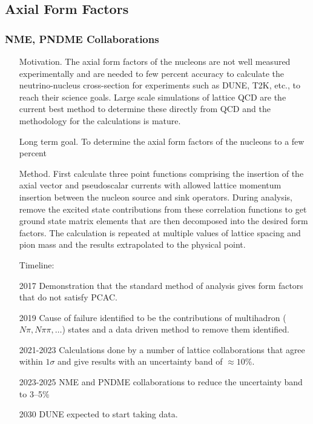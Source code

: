 \documentclass[prd,showpacs,showkeys,preprintnumbers,floatfix,
nofootinbib%
]{revtex4-2}
\begin{document}
\subsection{Axial Form Factors}\label{sec:axff}

\subsubsection{NME, PNDME Collaborations}
\begin{itemize}
    \item[Motivation.] The axial form factors of the nucleons are not well measured experimentally and are
      needed to few percent accuracy to calculate the neutrino-nucleus cross-section for experiments such as DUNE, T2K, etc., to 
      reach their science goals. Large scale simulations of lattice QCD are the current 
      best method to determine these directly from QCD and the methodology for the 
      calculations is mature. 
    \item[Long term goal.] To determine the axial form factors of the nucleons to a few percent 
    \item[Method.] First calculate three point functions comprising the insertion of the axial vector and pseudoscalar currents 
      with allowed lattice  momentum insertion between the nucleon source and sink operators. During analysis, remove 
      the excited state contributions from these correlation functions to get ground state matrix elements that are 
      then decomposed into the desired form factors. The calculation is repeated at multiple values of lattice spacing and 
      pion mass and the results extrapolated to the physical point. 
\item[Timeline:]
    \item[2017] Demonstration that the standard method of analysis gives form factors that do not satisfy PCAC.
    \item[2019] Cause of failure identified to be the contributions of multihadron ($N\pi, N\pi\pi, \ldots$) states 
      and a data driven method to remove them identified.
    \item[2021-2023] Calculations done by a number of lattice collaborations that agree within $1\sigma$ and give results
      with an uncertainty band of $\approx 10\%$.
    \item[2023-2025] NME and PNDME collaborations to reduce the uncertainty band to 3--5\%
    \item[2030] DUNE expected to start taking data.
\end{itemize}
\end{document}
